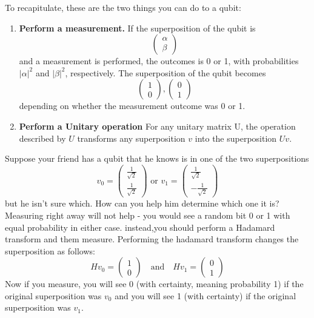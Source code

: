 To recapitulate, these are the two things you can do to a qubit:
\begin{enumerate}
    \item \textbf{Perform a measurement.} If the superposition of the qubit is
    \[
    \begin{pmatrix} \alpha \\ \beta \end{pmatrix}
    \]
    and a measurement is performed, the outcomes is 0 or 1, with probabilities $|\alpha|^2$ and $|\beta|^2$, respectively. The superposition of the qubit becomes
    \[
    \begin{pmatrix} 1 \\ 0 \end{pmatrix}, \begin{pmatrix} 0 \\1 \end{pmatrix}
    \]
    depending on whether the measurement outcome was 0 or 1.
    \item \textbf{Perform a Unitary operation} For any unitary matrix U, the operation described by $U$ transforms any superposition $v$ into the superposition $Uv$.
\end{enumerate}

\begin{example}
    Suppose your friend has a qubit that he knows is in one of the two superpositions
    \[
    v_0=\begin{pmatrix} \frac{1}{\sqrt{2}} \\ \frac{1}{\sqrt{2}} \end{pmatrix} \text{ or } v_1=\begin{pmatrix} \frac{1}{\sqrt{2}} \\ -\frac{1}{\sqrt{2}} \end{pmatrix}
    \]
    but he isn't sure which. How can you help him determine which one it is?
    Measuring right away will not help - you would see a random bit 0 or 1 with equal probability in either case. instead,you should perform a Hadamard transform and them measure. Performing the hadamard transform changes the superposition as follows:
    \[
    Hv_0=\begin{pmatrix} 1 \\ 0\end{pmatrix} \quad \text{and} \quad Hv_1 =\begin{pmatrix} 0 \\1 \end{pmatrix}
    \]
    Now if you measure, you will see 0 (with certainty, meaning probability 1) if the original superposition was $v_0$ and you will see 1 (with certainty) if the original superposition was $v_1$.
\end{example}

